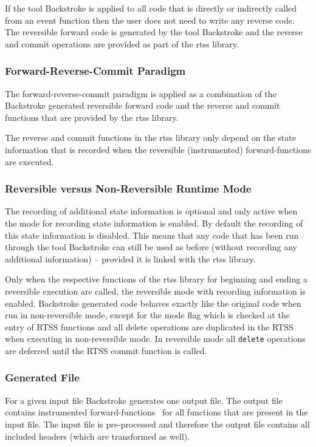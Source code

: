 \documentclass[english,12pt, titlepage]{article}      %
\newcommand{\forwardfunctions}{forward-functions}
\begin{document}
If the tool Backstroke is applied to all code that is directly or
indirectly called from an event function then the user does not need
to write any reverse code. The reversible forward code is generated by
the tool Backstroke and the reverse and commit operations are provided
as part of the rtss library.

\subsubsection{Forward-Reverse-Commit Paradigm}

The forward-reverse-commit paradigm is applied as a combination of the
Backstroke generated reversible forward code and the reverse and
commit functions that are provided by the rtss library.

The reverse and commit functions in the rtss library only depend on
the state information that is recorded when the reversible
(instrumented) \forwardfunctions{} are executed.

\subsubsection{Reversible versus Non-Reversible Runtime Mode}

The recording of additional state information is optional and only
active when the mode for recording state information is enabled. By
default the recording of this state information is disabled. This
means that any code that has been run through the tool Backstroke can
still be used as before (without recording any additional information)
-- provided it is linked with the rtss library.

Only when the respective functions of the rtss library for beginning
and ending a reversible execution are called, the reversible mode with
recording information is enabled. Backstroke generated code behaves
exactly like the original code when run in non-reversible mode, except
for the mode flag which is checked at the entry of RTSS functions and
all delete operations are duplicated in the RTSS when executing in
non-reversible mode. In reversible mode all \verb+delete+ operations
are deferred until the RTSS commit function is called.

\subsubsection{Generated File}

For a given input file Backstroke generates one output file. The
output file contains instrumented \forwardfunctions~ for all functions
that are present in the input file. The input file is pre-processed
and therefore the output file contains all included headers (which are
transformed as well).
\end{document}
